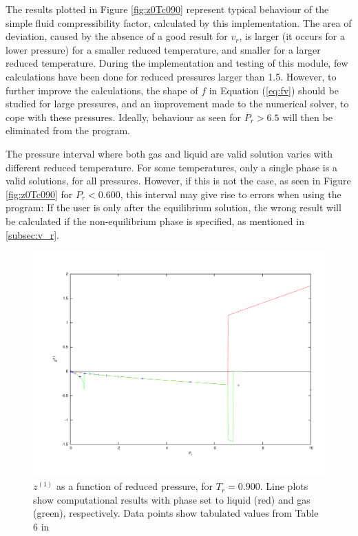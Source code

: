 \documentclass[english]{../thermomemo/thermomemo}
\numberwithin{equation}{section}
\newcommand*{\reff}[1]{(\ref{#1})}
\begin{document}
The results plotted in Figure \ref{fig:z0Tc090} represent typical behaviour of the simple fluid compressibility factor, calculated by this implementation. The area of deviation, caused by the absence of a good result for $v_r$, is larger (it occurs for a lower pressure) for a smaller reduced temperature, and smaller for a larger reduced temperature. During the implementation and testing of this module, few calculations have been done for reduced pressures larger than 1.5. However, to further improve the calculations, the shape of $f$ in Equation \reff{eq:fv} should be studied for large pressures, and an improvement made to the numerical solver, to cope with these pressures. Ideally, behaviour as seen for $P_r > 6.5$ will then be eliminated from the program.

The pressure interval where both gas and liquid are valid solution varies with different reduced temperature. For some temperatures, only a single phase is a valid solutions, for all pressures. However, if this is not the case, as seen in Figure \ref{fig:z0Tc090} for $P_r < 0.600$, this interval may give rise to errors when using the program: If the user is only after the equilibrium solution, the wrong result will be calculated if the non-equilibrium phase is specified, as mentioned in \ref{subsec:v_r}.

\begin{figure}
	\centering
	\includegraphics[trim = 1.5cm 2cm 0 1cm, clip = true, width=14cm]{z1Tc090}
	\caption{$z^{(1)}$ as a function of reduced pressure, for $T_r = 0.900$. Line plots show computational results with phase set to liquid (red) and gas (green), respectively. Data points show tabulated values from Table 6 in \cite{LK}}
	\label{fig:z1Tc090}
\end{figure}
\end{document}
